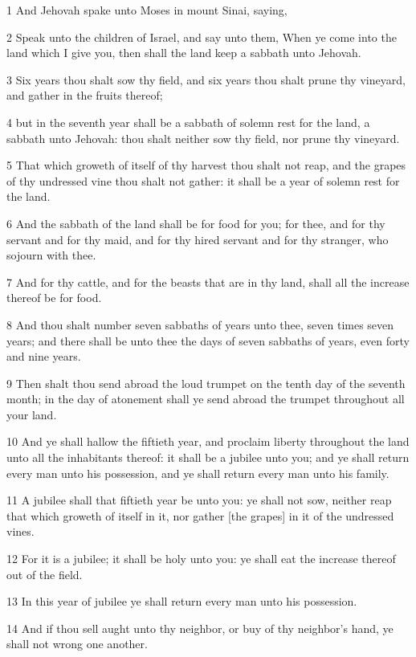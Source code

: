 \par 1 And Jehovah spake unto Moses in mount Sinai, saying,
\par 2 Speak unto the children of Israel, and say unto them, When ye come into the land which I give you, then shall the land keep a sabbath unto Jehovah.
\par 3 Six years thou shalt sow thy field, and six years thou shalt prune thy vineyard, and gather in the fruits thereof;
\par 4 but in the seventh year shall be a sabbath of solemn rest for the land, a sabbath unto Jehovah: thou shalt neither sow thy field, nor prune thy vineyard.
\par 5 That which groweth of itself of thy harvest thou shalt not reap, and the grapes of thy undressed vine thou shalt not gather: it shall be a year of solemn rest for the land.
\par 6 And the sabbath of the land shall be for food for you; for thee, and for thy servant and for thy maid, and for thy hired servant and for thy stranger, who sojourn with thee.
\par 7 And for thy cattle, and for the beasts that are in thy land, shall all the increase thereof be for food.
\par 8 And thou shalt number seven sabbaths of years unto thee, seven times seven years; and there shall be unto thee the days of seven sabbaths of years, even forty and nine years.
\par 9 Then shalt thou send abroad the loud trumpet on the tenth day of the seventh month; in the day of atonement shall ye send abroad the trumpet throughout all your land.
\par 10 And ye shall hallow the fiftieth year, and proclaim liberty throughout the land unto all the inhabitants thereof: it shall be a jubilee unto you; and ye shall return every man unto his possession, and ye shall return every man unto his family.
\par 11 A jubilee shall that fiftieth year be unto you: ye shall not sow, neither reap that which groweth of itself in it, nor gather [the grapes] in it of the undressed vines.
\par 12 For it is a jubilee; it shall be holy unto you: ye shall eat the increase thereof out of the field.
\par 13 In this year of jubilee ye shall return every man unto his possession.
\par 14 And if thou sell aught unto thy neighbor, or buy of thy neighbor's hand, ye shall not wrong one another.
